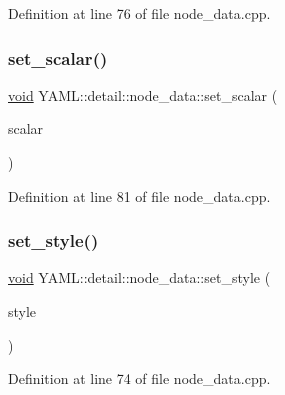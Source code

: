 Definition at line 76 of file node\+\_\+data.\+cpp.

\mbox{\label{class_y_a_m_l_1_1detail_1_1node__data_ac74624533162f0757b1f667da2c7d6ca}} 
\subsubsection{\texorpdfstring{set\_scalar()}{set\_scalar()}}
{\footnotesize\ttfamily \mbox{\hyperlink{glad_8h_a950fc91edb4504f62f1c577bf4727c29}{void}} Y\+A\+M\+L\+::detail\+::node\+\_\+data\+::set\+\_\+scalar (\begin{DoxyParamCaption}\item[{const \mbox{\hyperlink{glad_8h_ac83513893df92266f79a515488701770}{std\+::string}} \&}]{scalar }\end{DoxyParamCaption})}



Definition at line 81 of file node\+\_\+data.\+cpp.

\mbox{\label{class_y_a_m_l_1_1detail_1_1node__data_a7a2d678873cca6097c00c9b39b790285}} 
\subsubsection{\texorpdfstring{set\_style()}{set\_style()}}
{\footnotesize\ttfamily \mbox{\hyperlink{glad_8h_a950fc91edb4504f62f1c577bf4727c29}{void}} Y\+A\+M\+L\+::detail\+::node\+\_\+data\+::set\+\_\+style (\begin{DoxyParamCaption}\item[{\mbox{\hyperlink{struct_y_a_m_l_1_1_emitter_style_ae86640662c85ce6062a37f9636b6959f}{Emitter\+Style\+::value}}}]{style }\end{DoxyParamCaption})}



Definition at line 74 of file node\+\_\+data.\+cpp.

\mbox{\label{class_y_a_m_l_1_1detail_1_1node__data_ac9e581dc9fb4bedde979bddf3bf1830a}} 
